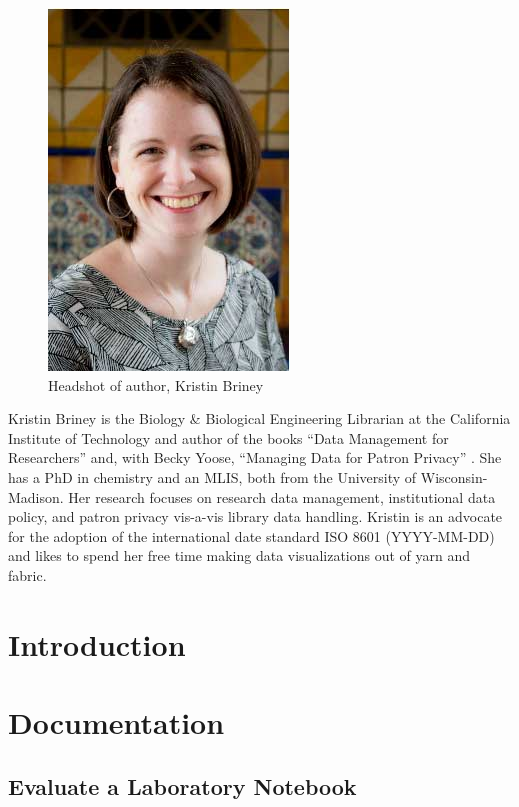 \documentclass[
]{book}
\begin{document}
\begin{figure}
\centering
\includegraphics{images/00_KristinBriney.jpg}
\caption{Headshot of author, Kristin Briney}
\end{figure}

Kristin Briney is the Biology \& Biological Engineering Librarian at the California Institute of Technology and author of the books ``Data Management for Researchers'' \citep{briney_data_2015} and, with Becky Yoose, ``Managing Data for Patron Privacy'' \citep{briney_managing_2022}. She has a PhD in chemistry and an MLIS, both from the University of Wisconsin-Madison. Her research focuses on research data management, institutional data policy, and patron privacy vis-a-vis library data handling. Kristin is an advocate for the adoption of the international date standard ISO 8601 (YYYY-MM-DD) and likes to spend her free time making data visualizations out of yarn and fabric.

\hypertarget{introduction}{%
\chapter{Introduction}\label{introduction}}

\hypertarget{documentation}{%
\chapter{Documentation}\label{documentation}}

\hypertarget{lab-notebook}{%
\section{Evaluate a Laboratory Notebook}\label{lab-notebook}}
\end{document}
